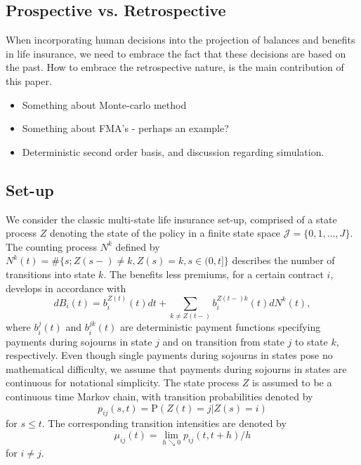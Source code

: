 \documentclass[12pt]{article}
\renewcommand{\P}{\text{P}}
\begin{document}
\subsection*{Prospective vs. Retrospective}
When incorporating human decisions into the projection of balances and benefits in life insurance, we need to embrace the fact that these decisions are based on the past. How to embrace the retrospective nature, is the main contribution of this paper.\\

\begin{itemize}
\item Something about Monte-carlo method
\item Something about FMA's - perhaps an example?
\item Deterministic second order basis, and discussion regarding simulation.
\end{itemize}

\subsection*{Set-up}
We consider the classic multi-state life insurance set-up, comprised of a state process $Z$ denoting the state of the policy in a finite state space $\mathcal{J}=\{0,1,...,J\}$. The counting process $N^k$ defined by $N^k(t)=\# \{ s; Z(s-)\neq k, Z(s)=k, s \in (0,t] \}$ describes the number of transitions into state $k$. The benefits less premiums, for a certain contract $i$, develops in accordance with
$$
dB_i(t)=b_i^{Z(t)}(t) dt +\sum_{k \neq Z(t-)} b_i^{Z(t-)k}(t)dN^k(t),
$$
where $b_i^j(t)$ and $b_i^{jk}(t)$ are deterministic payment functions specifying payments during sojourns in state $j$ and on transition from state $j$ to state $k$, respectively. Even though single payments during sojourns in states pose no mathematical difficulty, we assume that payments during sojourns in states are continuous for notational simplicity. The state process $Z$ is assumed to be a continuous time Markov chain, with transition probabilities denoted by
$$
p_{ij}(s,t)= \P(Z(t)=j|Z(s)=i)
$$
for $s\leq t$. The corresponding transition intensities are denoted by
$$
\mu_{ij}(t)=\lim_{h \searrow 0} p_{ij}(t,t+h)/h
$$
for $i \neq j$. 
\end{document}
